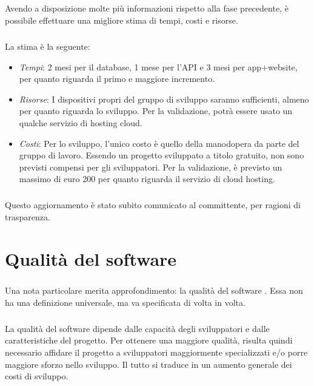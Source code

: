 \documentclass[12pt,a4paper,twoside,english,italian]{book}
\begin{document}
\paragraph{} Avendo a disposizione molte più informazioni rispetto alla fase precedente, è possibile effettuare una migliore stima di tempi, costi e risorse. 

\paragraph{} La stima è la seguente:
\begin{itemize}
    \item \emph{Tempi}: 2 mesi per il database, 1 mese per l'API e 3 mesi per app+website, per quanto riguarda il primo e maggiore incremento. 
    \item \emph{Risorse}: I dispositivi propri del gruppo di sviluppo saranno sufficienti, almeno per quanto riguarda lo sviluppo. Per la validazione, potrà essere usato un qualche servizio di hosting cloud.
    \item \emph{Costi}: Per lo sviluppo, l'unico costo è quello della manodopera da parte del gruppo di lavoro. Essendo un progetto sviluppato a titolo gratuito, non sono previsti compensi per gli sviluppatori. Per la validazione, è previsto un massimo di euro 200 per quanto riguarda il servizio di cloud hosting. 
\end{itemize}

\paragraph{} Questo aggiornamento è stato subito comunicato al committente, per ragioni di trasparenza. 


\chapter{Qualità del software}

\paragraph{} Una nota particolare merita approfondimento: la qualità del software \cite{quality}. Essa non ha una definizione universale, ma va specificata di volta in volta.

\paragraph{} La qualità del software dipende dalle capacità degli sviluppatori e dalle caratteristiche del progetto. Per ottenere una maggiore qualità, risulta quindi necessario affidare il progetto a sviluppatori maggiormente specializzati e/o porre maggiore sforzo nello sviluppo. Il tutto si traduce in un aumento generale dei costi di sviluppo. 
\end{document}
